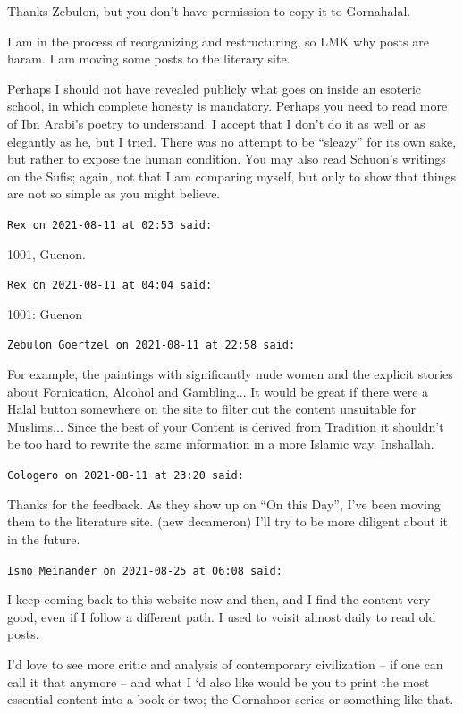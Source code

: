 \begin{footnotesize}
\begin{sffamily}
Thanks Zebulon, but you don't have permission to copy it to Gornahalal.

I am in the process of reorganizing and restructuring, so LMK why posts are haram. I am moving some posts to the literary site.

Perhaps I should not have revealed publicly what goes on inside an esoteric school, in which complete honesty is mandatory. Perhaps you need to read more of Ibn Arabi's poetry to understand. I accept that I don't do it as well or as elegantly as he, but I tried. There was no attempt to be ``sleazy'' for its own sake, but rather to expose the human condition. You may also read Schuon's writings on the Sufis; again, not that I am comparing myself, but only to show that things are not so simple as you might believe.

\hfill

\texttt{Rex on 2021-08-11 at 02:53 said:}

1001, Guenon.

\hfill

\texttt{Rex on 2021-08-11 at 04:04 said:}

1001: Guenon

\hfill

\texttt{Zebulon Goertzel on 2021-08-11 at 22:58 said:}

For example, the paintings with significantly nude women and the explicit stories about Fornication, Alcohol and Gambling... It would be great if there were a Halal button somewhere on the site to filter out the content unsuitable for Muslims... Since the best of your Content is derived from Tradition it shouldn't be too hard to rewrite the same information in a more Islamic way, Inshallah.

\hfill

\texttt{Cologero on 2021-08-11 at 23:20 said:}

Thanks for the feedback. As they show up on ``On this Day'', I've been moving them to the literature site. (new decameron) I'll try to be more diligent about it in the future.

\hfill

\texttt{Ismo Meinander on 2021-08-25 at 06:08 said:}

I keep coming back to this website now and then, and I find the content very good, even if I follow a different path. I used to voisit almost daily to read old posts.

I'd love to see more critic and analysis of contemporary civilization -- if one can call it that anymore -- and what I `d also like would be you to print the most essential content into a book or two; the Gornahoor series or something like that.


\end{sffamily}
\end{footnotesize}
